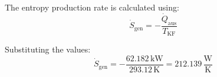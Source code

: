 The entropy production rate is calculated using:  
\[
\dot{S}_{\text{gen}} = -\frac{\dot{Q}_{\text{aus}}}{T_{\text{KF}}}
\]  

Substituting the values:  
\[
\dot{S}_{\text{gen}} = -\frac{62.182 \, \text{kW}}{293.12 \, \text{K}} = 212.139 \, \frac{\text{W}}{\text{K}}
\]